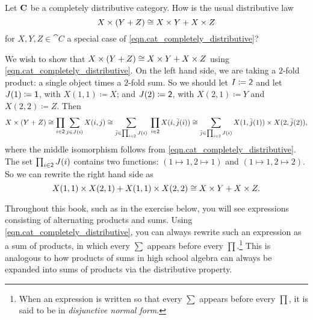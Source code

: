 \documentclass[Book-Poly]{subfiles}
\begin{document}
\begin{exercise}
    Let $\mathbf{C}$ be a completely distributive category.
    How is the usual distributive law
    \[
    X\times(Y+Z)\cong X\times Y+X\times Z
    \]
    for $X,Y,Z\in\cat{C}$ a special case of \eqref{eqn.cat_completely_distributive}?
    \begin{solution}
        We wish to show that $X\times (Y+Z)\cong X\times Y+X\times Z$ using \eqref{eqn.cat_completely_distributive}.
        On the left hand side, we are taking a $2$-fold product: a single object times a $2$-fold sum.
        So we should let $I\coloneqq\textsf{2}$ and let $J(1)\coloneqq\textsf{1}$, with $X(1,1)\coloneqq X$; and $J(2)\coloneqq\textsf{2}$, with $X(2,1)\coloneqq Y$ and $X(2,2)\coloneqq Z$.
        Then
        \[
        X\times(Y+Z)\cong \prod_{i\in\textsf{2}}\sum_{j\in J(i)}X(i,j) \cong \sum_{\bar{j}\in\prod_{i\in\textsf{2}}J(i)}\;\prod_{i\in \textsf{2}}X(i,\bar{j}(i)) \cong \sum_{\bar{j}\in\prod_{i\in\textsf{2}}J(i)}X(1,\bar{j}(1))\times X(2,\bar{j}(2)),
        \]
        where the middle isomorphism follows from \eqref{eqn.cat_completely_distributive}.
        The set $\prod_{i\in\textsf{2}}J(i)$ contains two functions: $(1\mapsto1,2\mapsto1)$ and $(1\mapsto1,2\mapsto2)$.
        So we can rewrite the right hand side as
        \[
        X(1,1)\times X(2,1)+X(1,1)\times X(2,2)\cong X\times Y+X\times Z.
        \]
    \end{solution}
\end{exercise}

Throughout this book, such as in the exercise below, you will see expressions consisting of alternating products and sums.
Using \eqref{eqn.cat_completely_distributive}, you can always rewrite such an expression as a sum of products, in which every $\sum$ appears before every $\prod$.\footnote{When an expression is written so that every $\sum$ appears before every $\prod$, it is said to be in \emph{disjunctive normal form}.}
This is analogous to how products of sums in high school algebra can always be expanded into sums of products via the distributive property.
\end{document}
